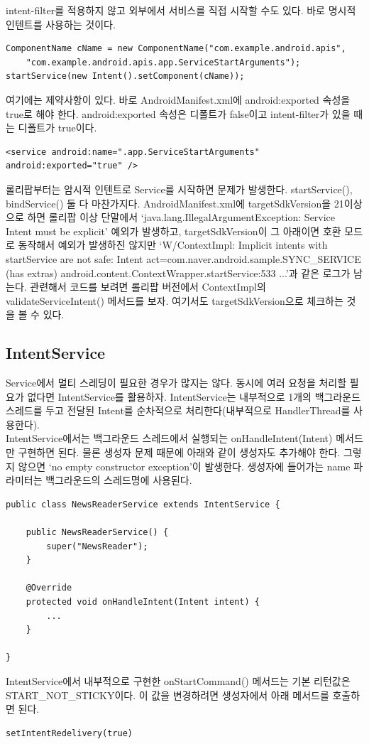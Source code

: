 intent-filter를 적용하지 않고 외부에서 서비스를 직접 시작할 수도 있다. 바로 명시적 인텐트를 사용하는 것이다.
\begin{lstlisting}[frame=single]
ComponentName cName = new ComponentName("com.example.android.apis",
	"com.example.android.apis.app.ServiceStartArguments");
startService(new Intent().setComponent(cName));
\end{lstlisting}

여기에는 제약사항이 있다. 바로 AndroidManifest.xml에 android:exported 속성을 true로 해야 한다. android:exported 속성은 디폴트가 false이고 intent-filter가 있을 때는 디폴트가 true이다.
\begin{lstlisting}[frame=single]
<service android:name=".app.ServiceStartArguments" android:exported="true" />
\end{lstlisting}

롤리팝부터는 암시적 인텐트로 Service를 시작하면 문제가 발생한다. startService(), bindService() 둘 다 마찬가지다.
AndroidManifest.xml에 targetSdkVersion을 21이상으로 하면 롤리팝 이상 단말에서 `java.lang.IllegalArgu\-mentException: Service Intent must be explicit'  예외가 발생하고, targetSdkVersion이 그 아래이면 호환 모드로 동작해서 예외가 발생하진 않지만 `W/ContextImpl: Implicit intents with startService are not safe: Intent { act=com.naver.android.sample.SYNC\_SER\-VICE (has extras) } android.content.ContextWrapper.startService:533 ...'과 같은 로그가 남는다. 
관련해서 코드를 보려면 롤리팝 버전에서 ContextImpl의 validateServiceIntent() 메서드를 보자. 여기서도 targetSdkVersion으로 체크하는 것을 볼 수 있다.

\subsection{IntentService}
Service에서 멀티 스레딩이 필요한 경우가 많지는 않다. 동시에 여러 요청을 처리할 필요가 없다면 IntentService를 활용하자.
IntentService는 내부적으로 1개의 백그라운드 스레드를 두고 전달된 Intent를 순차적으로 처리한다(내부적으로 HandlerThread를 사용한다).\\

IntentService에서는 백그라운드 스레드에서 실행되는 onHandleIntent(Intent) 메서드만 구현하면 된다.
물론 생성자 문제 때문에 아래와 같이 생성자도 추가해야 한다. 그렇지 않으면 `no empty constructor exception'이 발생한다. 
생성자에 들어가는 name 파라미터는  백그라운드의 스레드명에 사용된다.
\begin{lstlisting}[frame=single]
public class NewsReaderService extends IntentService {

	public NewsReaderService() {
		super("NewsReader");
	}

	@Override
	protected void onHandleIntent(Intent intent) {
		...
	}
	
}	
\end{lstlisting}
IntentService에서 내부적으로 구현한 onStartCommand() 메서드는 기본 리턴값은 START\_NOT\_\-STICKY이다. 이 값을 변경하려면 생성자에서 아래 메서드를 호출하면 된다.
\begin{lstlisting}[frame=single]
setIntentRedelivery(true)
\end{lstlisting}

